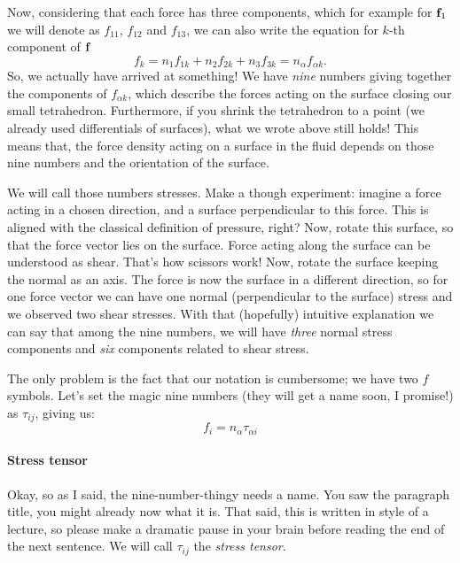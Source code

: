 \documentclass{article}
\begin{document}
Now, considering that each force has three components, which for example for 
\(\vb{f}_1\) we will denote as \(f_{11}\), \(f_{12}\) and \(f_{13}\), we can 
also write the equation for \(k\)-th component of \(\vb{f}\)
\[
  f_k = n_1 f_{1k} + n_2 f_{2k} +n_3 f_{3k} = n_\alpha f_{\alpha k}.
\]
So, we actually have arrived at something! We have \emph{nine} numbers giving
together the components of \(f_{\alpha k}\), which describe the forces acting 
on the surface closing our small tetrahedron. Furthermore, if you shrink the 
tetrahedron to a point (we already used differentials of surfaces), what we 
wrote above still holds! This means that, the force density acting on a surface 
in the fluid depends on those nine numbers and the orientation of the surface.

We will call those numbers stresses. Make a though experiment: imagine a force 
acting in a chosen direction, and a surface perpendicular to this force. This 
is aligned with the classical definition of pressure, right? Now, rotate this 
surface, so that the force vector lies on the surface. Force acting along the 
surface can be understood as shear. That's how scissors work! Now, rotate the 
surface keeping the normal as an axis. The force is now  the 
surface in a different direction, so for one force vector we can have one normal 
(perpendicular to the surface)
stress and we observed two shear stresses. With that (hopefully) intuitive 
explanation we can say that among the nine numbers, we will have \emph{three}
normal stress components and \emph{six} components related to shear stress.

The only problem is the fact that our notation is cumbersome; we have two \(f\)
symbols. Let's set the magic nine numbers (they will get a name soon, I promise!) 
as \(\tau_{ij}\), giving us:
\[
  f_i = n_\alpha \tau_{\alpha i}
\]

\paragraph{Stress tensor}
Okay, so as I said, the nine-number-thingy needs a name. You saw the paragraph
title, you might already now what it is. That said, this is written in style of 
a lecture, so please make a dramatic pause in your brain before reading the end of the 
next sentence. We will call \(\tau_{ij}\) the \emph{stress tensor}. 
\end{document}
